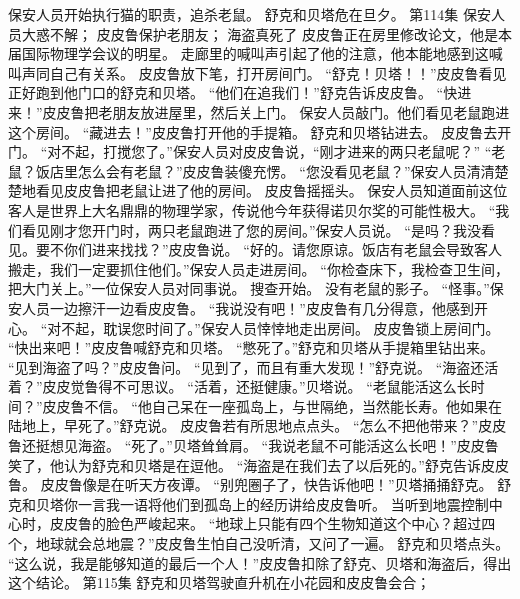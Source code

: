 \documentclass[a4paper,12pt,UTF8,twoside]{ctexbook}
\begin{document}
        保安人员开始执行猫的职责，追杀老鼠。 
        舒克和贝塔危在旦夕。   第114集 
        保安人员大惑不解； 
        皮皮鲁保护老朋友； 
        海盗真死了   
        皮皮鲁正在房里修改论文，他是本届国际物理学会议的明星。 
        走廊里的喊叫声引起了他的注意，他本能地感到这喊叫声同自己有关系。 
        皮皮鲁放下笔，打开房间门。 
        “舒克！贝塔！！”皮皮鲁看见正好跑到他门口的舒克和贝塔。 
        “他们在追我们！”舒克告诉皮皮鲁。 
        “快进来！”皮皮鲁把老朋友放进屋里，然后关上门。 
        保安人员敲门。他们看见老鼠跑进这个房间。 
        “藏进去！”皮皮鲁打开他的手提箱。 
        舒克和贝塔钻进去。 
        皮皮鲁去开门。 
        “对不起，打搅您了。”保安人员对皮皮鲁说，“刚才进来的两只老鼠呢？” 
        “老鼠？饭店里怎么会有老鼠？”皮皮鲁装傻充愣。 
        “您没看见老鼠？”保安人员清清楚楚地看见皮皮鲁把老鼠让进了他的房间。 
        皮皮鲁摇摇头。 
        保安人员知道面前这位客人是世界上大名鼎鼎的物理学家，传说他今年获得诺贝尔奖的可能性极大。 
        “我们看见刚才您开门时，两只老鼠跑进了您的房间。”保安人员说。 
        “是吗？我没看见。要不你们进来找找？”皮皮鲁说。 
        “好的。请您原谅。饭店有老鼠会导致客人搬走，我们一定要抓住他们。”保安人员走进房间。 
        “你检查床下，我检查卫生间，把大门关上。”一位保安人员对同事说。 
        搜查开始。 
        没有老鼠的影子。 
        “怪事。”保安人员一边擦汗一边看皮皮鲁。 
        “我说没有吧！”皮皮鲁有几分得意，他感到开心。 
        “对不起，耽误您时间了。”保安人员悻悻地走出房间。 
        皮皮鲁锁上房间门。 
        “快出来吧！”皮皮鲁喊舒克和贝塔。 
        “憋死了。”舒克和贝塔从手提箱里钻出来。 
        “见到海盗了吗？”皮皮鲁问。 
        “见到了，而且有重大发现！”舒克说。 
        “海盗还活着？”皮皮觉鲁得不可思议。 
        “活着，还挺健康。”贝塔说。 
        “老鼠能活这么长时间？”皮皮鲁不信。 
        “他自己呆在一座孤岛上，与世隔绝，当然能长寿。他如果在陆地上，早死了。”舒克说。 
        皮皮鲁若有所思地点点头。 
        “怎么不把他带来？”皮皮鲁还挺想见海盗。 
        “死了。”贝塔耸耸肩。 
        “我说老鼠不可能活这么长吧！”皮皮鲁笑了，他认为舒克和贝塔是在逗他。 
        “海盗是在我们去了以后死的。”舒克告诉皮皮鲁。 
        皮皮鲁像是在听天方夜谭。 
        “别兜圈子了，快告诉他吧！”贝塔捅捅舒克。 
        舒克和贝塔你一言我一语将他们到孤岛上的经历讲给皮皮鲁听。 
       当听到地震控制中心时，皮皮鲁的脸色严峻起来。 
       “地球上只能有四个生物知道这个中心？超过四个，地球就会总地震？”皮皮鲁生怕自己没听清，又问了一遍。 
        舒克和贝塔点头。 
        “这么说，我是能够知道的最后一个人！”皮皮鲁扣除了舒克、贝塔和海盗后，得出这个结论。   第115集 
        舒克和贝塔驾驶直升机在小花园和皮皮鲁会合； 
\end{document}
